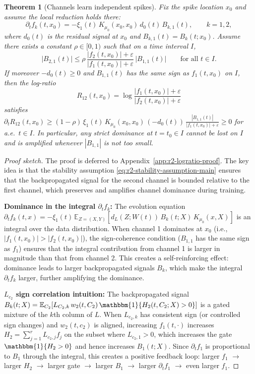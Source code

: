 \documentclass[11pt]{article}
\newcommand{\E}{\mathbb{E}}
\newcommand{\1}{\mathbbm{1}}
\newtheorem{theorem}{Theorem}
\begin{document}
\begin{theorem}[Channels learn independent spikes]
\label{thm:r2-logratio-criterion-main}
Fix the spike location $x_0$ and assume the local reduction holds there:
\[
\partial_t f_k(t,x_0)=-\xi_1(t)\,K_{\mu_0}(x_0,x_0)\,d_0(t)\,B_{k,1}(t),\qquad k=1,2,
\]
where $d_0(t)$ is the residual signal at $x_0$ and $B_{k,1}(t)=B_k(t;x_0)$. Assume there exists a constant $\rho\in[0,1)$ such that on a time interval $I$,
\begin{equation}
\label{eq:r2-stability-assumption-main}
\big|B_{2,1}(t)\big|\le \rho\,\frac{|f_2(t,x_0)|+\varepsilon}{|f_1(t,x_0)|+\varepsilon}\,\big|B_{1,1}(t)\big|
\qquad\text{for all }t\in I.
\end{equation}
If moreover $-d_0(t)\ge 0$ and $B_{1,1}(t)$ has the same sign as $f_1(t,x_0)$ on $I$, then the log-ratio
\[
R_{12}(t,x_0)=\log\frac{|f_1(t,x_0)|+\varepsilon}{|f_2(t,x_0)|+\varepsilon}
\]
satisfies $\partial_t R_{12}(t,x_0)\ge (1-\rho)\,\xi_1(t)\,K_{\mu_0}(x_0,x_0)\,(-d_0(t))\,\frac{|B_{1,1}(t)|}{|f_1(t,x_0)|+\varepsilon}\ge 0$ for a.e.\ $t\in I$. In particular, any strict dominance at $t=t_0\in I$ cannot be lost on $I$ and is amplified whenever $|B_{1,1}|$ is not too small.
\end{theorem}

\begin{proof}[Proof sketch]
The proof is deferred to Appendix~\ref{app:r2-logratio-proof}. The key idea is that the stability assumption \eqref{eq:r2-stability-assumption-main} ensures that the backpropagated signal for the second channel is bounded relative to the first channel, which preserves and amplifies channel dominance during training.

\textbf{Dominance in the integral $\partial_t f_k$:} The evolution equation $\partial_t f_k(t,x)=-\xi_1(t)\,\E_{Z=(X,Y)}[d_L(Z;W(t))\,B_k(t;X)\,K_{\mu_0}(x,X)]$ is an integral over the data distribution. When channel 1 dominates at $x_0$ (i.e., $|f_1(t,x_0)|>|f_2(t,x_0)|$), the sign-coherence condition ($B_{1,1}$ has the same sign as $f_1$) ensures that the integral contribution from channel 1 is larger in magnitude than that from channel 2. This creates a self-reinforcing effect: dominance leads to larger backpropagated signals $B_k$, which make the integral $\partial_t f_k$ larger, further amplifying the dominance.

\textbf{$L_{c_2}$ sign correlation intuition:} The backpropagated signal $B_k(t;X)=\E_{C_2}[L_{C_2,k}\,w_2(t,C_2)\,\1\{H_2(t,C_2;X)>0\}]$ is a gated mixture of the $k$th column of $L$. When $L_{c_2,k}$ has consistent sign (or controlled sign changes) and $w_2(t,c_2)$ is aligned, increasing $f_1(t,\cdot)$ increases $H_2=\sum_{j=1}^r L_{c_2,j}f_j$ on the subset where $L_{c_2,1}>0$, which increases the gate $\1\{H_2>0\}$ and hence increases $B_1(t;X)$. Since $\partial_t f_1$ is proportional to $B_1$ through the integral, this creates a positive feedback loop: larger $f_1$ $\to$ larger $H_2$ $\to$ larger gate $\to$ larger $B_1$ $\to$ larger $\partial_t f_1$ $\to$ even larger $f_1$.
\end{proof}
\end{document}

